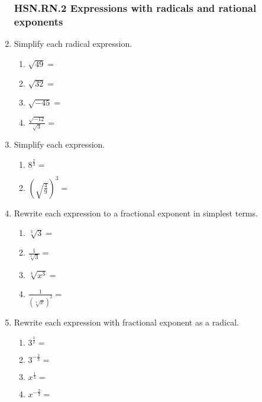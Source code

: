 \documentclass[12pt, twoside]{article}
\begin{document}
\begin{enumerate}[itemsep=0.5cm]
\subsubsection*{HSN.RN.2 Expressions with radicals and rational exponents}
\item Simplify each radical expression.
    \begin{multicols}{2}
    \begin{enumerate}[itemsep=0.5cm]
        \item $\sqrt{49}=$
        \item $\sqrt{32}=$
        \item $\sqrt{-45}=$
        \item $\displaystyle \frac{\sqrt{-12}}{\sqrt{3}}=$
    \end{enumerate}
    \end{multicols} \vspace{1cm}
    
\item Simplify each expression.
    \begin{multicols}{2}
    \begin{enumerate}[itemsep=0.5cm]
        \item $\displaystyle 8^{\frac{2}{3}} =$
        \item $\left( \sqrt{\frac{4}{9}} \right)^{3} =$
    \end{enumerate}
    \end{multicols} \vspace{2cm}

    
\item Rewrite each expression to a fractional exponent in simplest terms.
    \begin{multicols}{2}
      \begin{enumerate}[itemsep=1cm]
          \item $\sqrt[3]{3} =$
          \item $\displaystyle \frac{1}{\sqrt[2]{3}}=$
          \item $\sqrt[4]{x^3} =$
          \item $\displaystyle \frac{1}{(\sqrt[4]{x})^2}=$
      \end{enumerate}
      \end{multicols} \vspace{1cm}
  
\item Rewrite each expression with fractional exponent as a radical.
    \begin{multicols}{2}
      \begin{enumerate}[itemsep=1cm]
        \item $\displaystyle 3^{\frac{1}{2}}=$
        \item $\displaystyle 3^{-\frac{2}{3}}=$
        \item $\displaystyle x^{\frac{1}{3}}=$
        \item $\displaystyle x^{-\frac{2}{3}}=$
      \end{enumerate}
      \end{multicols}


\end{enumerate}
\end{document}
